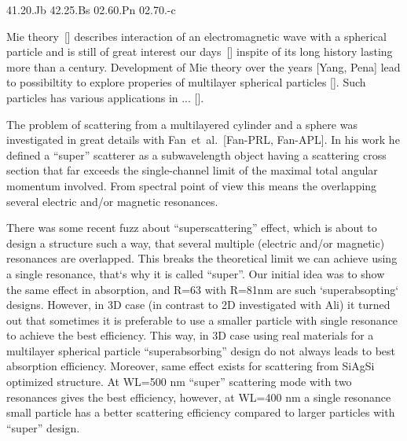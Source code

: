 \documentclass[aps,prl,twocolumn,showpacs,superscriptaddress,groupedaddress]{revtex4-1}
\begin{document}
\pacs%
{41.20.Jb 42.25.Bs 02.60.Pn 02.70.-c}

\maketitle %

Mie theory~[] describes interaction of an electromagnetic wave with a
spherical particle and is still of great interest our days~[] inspite
of its long history lasting more than a century.  Development of Mie
theory over the years [Yang, Pena] lead to possibiltity to explore
properies of multilayer spherical particles []. Such particles has
various applications in ... [].

The problem of scattering from a multilayered cylinder and a sphere
was investigated in great details with Fan~et~al.~[Fan-PRL, Fan-APL].
In his work he defined a ``super'' scatterer as a subwavelength object
having a scattering cross section that far exceeds the single-channel
limit of the maximal total angular momentum involved.  From spectral
point of view this means the overlapping several electric and/or
magnetic resonances.

 


  There was some recent fuzz about ``superscattering'' effect, which is
  about to design a structure such a way, that several multiple
  (electric and/or magnetic) resonances are overlapped.  This breaks
  the theoretical limit we can achieve using a single resonance,
  that`s why it is called ``super''. Our initial idea was to show the
  same effect in absorption, and R=63 with R=81nm are such
  `superabsopting` designs. However, in 3D case (in contrast to 2D
  investigated with Ali) it turned out that sometimes it is preferable
  to use a smaller particle with single resonance to achieve the best
  efficiency. This way, in 3D case using real materials for a
  multilayer spherical particle ``superabsorbing'' design do not
  always leads to best absorption efficiency. Moreover, same effect
  exists for scattering from SiAgSi optimized structure. At WL=500 nm
  ``super'' scattering mode with two resonances gives the best
  efficiency, however, at WL=400 nm a single resonance small particle
  has a better scattering efficiency compared to larger particles with
  ``super'' design.
\end{document}
